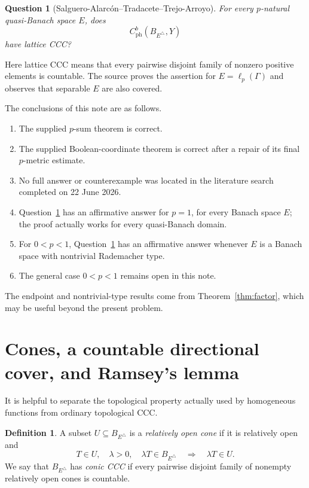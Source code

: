\documentclass[11pt]{article}
\newtheorem{question}[theorem]{Question}
\theoremstyle{definition}
\newtheorem{definition}[theorem]{Definition}
\newcommand{\cph}{C_{\mathrm{ph}}^b}
\begin{document}
\begin{question}[Salguero-Alarc\'on--Tradacete--Trejo-Arroyo]
\label{q:source}
For every $p$-natural quasi-Banach space $E$, does
\[
 \cph(B_{E^\triangle},Y)
\]
have lattice CCC?
\end{question}

Here lattice CCC means that every pairwise disjoint family of nonzero positive
elements is countable.  The source proves the assertion for $E=\ell_p(\Gamma)$
and observes that separable $E$ are also covered.

The conclusions of this note are as follows.

\begin{enumerate}[label=\textup{(\Roman*)}]
\item The supplied $p$-sum theorem is correct.
\item The supplied Boolean-coordinate theorem is correct after a repair of its
final $p$-metric estimate.
\item No full answer or counterexample was located in the literature search
completed on 22 June 2026.
\item Question~\ref{q:source} has an affirmative answer for $p=1$, for every
Banach space $E$; the proof actually works for every quasi-Banach domain.
\item For $0<p<1$, Question~\ref{q:source} has an affirmative answer whenever
$E$ is a Banach space with nontrivial Rademacher type.
\item The general case $0<p<1$ remains open in this note.
\end{enumerate}

The endpoint and nontrivial-type results come from Theorem~\ref{thm:factor},
which may be useful beyond the present problem.

\section{Cones, a countable directional cover, and Ramsey's lemma}

It is helpful to separate the topological property actually used by homogeneous
functions from ordinary topological CCC.

\begin{definition}
A subset $U\subseteq B_{E^\triangle}$ is a \emph{relatively open cone} if it is
relatively open and
\[
 T\in U,\quad \lambda>0,\quad \lambda T\in B_{E^\triangle}
 \quad\Longrightarrow\quad \lambda T\in U.
\]
We say that $B_{E^\triangle}$ has \emph{conic CCC} if every pairwise disjoint
family of nonempty relatively open cones is countable.
\end{definition}
\end{document}
